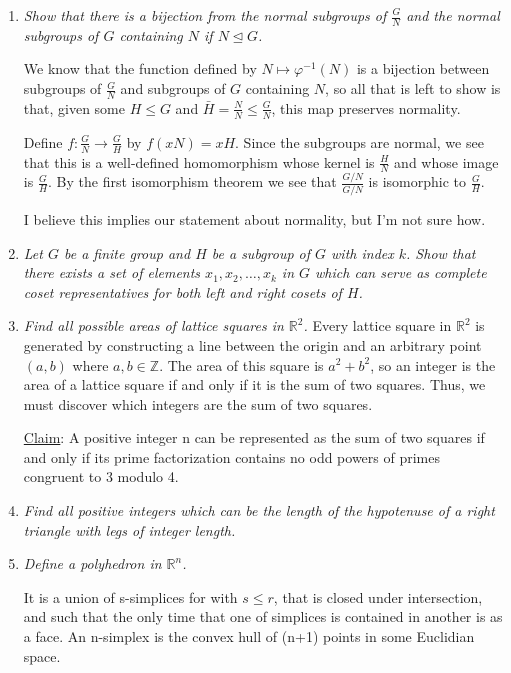 \documentclass[11pt]{article}
\begin{document}
\begin{enumerate}
\item \emph{Show that there is a bijection from the normal subgroups of $\frac{G}{N}$ and the normal subgroups of $G$ containing $N$ if $N \unlhd G$.}

We know that the function defined by $N \mapsto \varphi^{-1}(N)$ is a bijection between subgroups of $\frac{G}{N}$ and subgroups of $G$ containing $N$, so all that is left to show is that, given some $H \leq G$ and $\bar{H}=\frac{N}{N} \leq \frac{G}{N}$, this map preserves normality. 

Define $f: \frac{G}{N} \rightarrow \frac{G}{H}$ by $f(xN)=xH$.  Since the subgroups are normal, we see that this is a well-defined homomorphism whose kernel is $\frac{H}{N}$ and whose image is $\frac{G}{H}$.  By the first isomorphism theorem we see that $\frac{G/N}{G/N}$ is isomorphic to $\frac{G}{H}$.

I believe this implies our statement about normality, but I'm not sure how.

\item \emph{Let $G$ be a finite group and $H$ be a subgroup of $G$ with index $k$.  Show that there exists a set of elements $x_1,x_2,\ldots,x_k$ in $G$ which can serve as complete coset representatives for both left and right cosets of $H$.}

\item \emph{Find all possible areas of lattice squares in $\mathbb{R}^2$.}
Every lattice square in $\mathbb{R}^2$ is generated by constructing a line between the origin and an arbitrary point $(a,b)$ where $a,b \in \mathbb{Z}$.  The area of this square is $a^2 + b^2$, so an integer is the area of a lattice square if and only if it is the sum of two squares.  Thus, we must discover which integers are the sum of two squares.

\underline{Claim}: A positive integer n can be represented as the sum of two squares if and only if its prime factorization contains no odd powers of primes congruent to 3 modulo 4.

\item \emph{Find all positive integers which can be the length of the hypotenuse of a right triangle with legs of integer length.}
 
\item \emph{Define a polyhedron in $\mathbb{R}^n$.}

It is a union of s-simplices for with $s \leq r$, that is closed under intersection, and such that the only time that one of simplices is contained in another is as a face.  An n-simplex is the convex hull of (n+1) points in some Euclidian space.


\end{enumerate}
\end{document}
